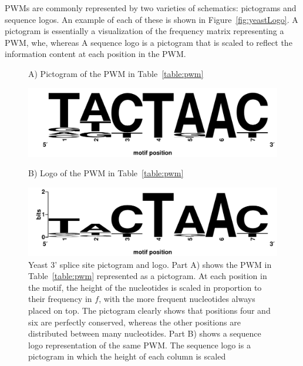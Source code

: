     PWMs are commonly represented by two varieties of schematics:
    pictograms and sequence logos.  An example of each of these is
    shown in Figure~\vref{fig:yeastLogo}.
    A pictogram is essentially a visualization of the frequency
    matrix representing a PWM, whe, whereas  A sequence logo is a pictogram
    that is scaled to reflect the information content at each
    position in the PWM\@.

            \begin{figure}[ptb]
        A) Pictogram of the PWM in Table~\vref{table:pwm}
            \begin{center}
            \includegraphics[width=\textwidth]{Body/Images-chap1/yeast-logo2.pdf}
            \end{center}
        \bigskip
            B) Logo of the PWM in Table~\vref{table:pwm}
            \begin{center}
        \includegraphics[width=\textwidth]{Body/Images-chap1/yeast-logo1.pdf}
            \end{center}
            \caption[Yeast 3' splice site pictogram and logo]{
            Yeast 3' splice site pictogram and logo. Part A) shows
            the
            PWM in Table~\vref{table:pwm} represented as a
            pictogram.  At each position in the motif, the height of
            the nucleotides is scaled in proportion to their
            frequency in $f$, with the more frequent nucleotides
            always placed on top.  The pictogram clearly shows that
            positions four and six are perfectly conserved, whereas
            the other positions are distributed between many
            nucleotides.  Part B) shows a sequence logo
            representation of the same PWM.  The sequence logo is a
            pictogram in which the height of each column is scaled
}
\end{figure}
